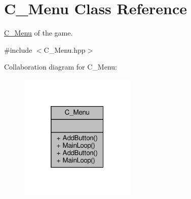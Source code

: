 \hypertarget{classC__Menu}{}\section{C\+\_\+\+Menu Class Reference}
\label{classC__Menu}


\hyperlink{classC__Menu}{C\+\_\+\+Menu} of the game.  




{\ttfamily \#include $<$C\+\_\+\+Menu.\+hpp$>$}



Collaboration diagram for C\+\_\+\+Menu\+:\nopagebreak
\begin{figure}[H]
\begin{center}
\leavevmode
\includegraphics[width=157pt]{classC__Menu__coll__graph}
\end{center}
\end{figure}
